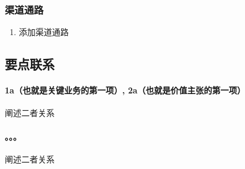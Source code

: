 \documentclass[a4paper]{ctexart}
\begin{document}
\subsubsection{渠道通路}

\begin{enumerate}[label=\alph*.]
  \item 添加渠道通路
\end{enumerate}


\subsection{要点联系}

\paragraph{1a（也就是关键业务的第一项）, 2a（也就是价值主张的第一项）}阐述二者关系
\paragraph{。。。}阐述二者关系
\end{document}
